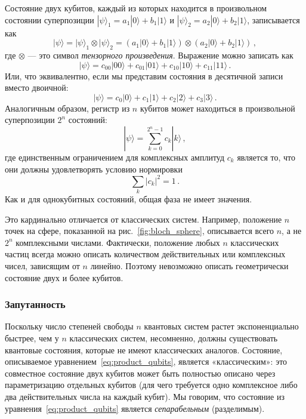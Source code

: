 \documentclass[a4paper,14pt]{extreport} %
\newcommand{\ket}[1]{|#1\rangle}
\begin{document}
Состояние двух кубитов, каждый из которых находится в произвольном состоянии суперпозиции
$\ket{\psi}_1 = a_1 \ket{0} + b_1 \ket{1}$ и $\ket{\psi}_2 = a_2
\ket{0} + b_2 \ket{1}$, записывается как
%
\begin{equation}
\ket{\psi} = \ket{\psi}_1 \otimes \ket{\psi}_2
= (a_1 \ket{0} + b_1 \ket{1}) \otimes (a_2 \ket{0} + b_2 \ket{1}) \,,
\label{eq:product_qubits}
\end{equation}
%
где $\otimes$ — это символ {\em тензорного произведения}.
Выражение можно записать как
\begin{equation}
\ket{\psi} = 
c_{00} \ket{00} + c_{01} \ket{01} + 
c_{10} \ket{10} + c_{11} \ket{11} \,.
\end{equation}
\noindent Или, что эквивалентно, если мы представим состояния в десятичной записи вместо двоичной:
\begin{equation}
\ket{\psi} = 
c_{0} \ket{0} + c_{1} \ket{1} + c_{2} \ket{2} + c_{3} \ket{3} \,.
\label{eq:psi_c_i}
\end{equation}
%
Аналогичным образом, регистр из $n$ кубитов может находиться в произвольной
суперпозиции $2^n$ состояний:
\begin{equation}
\ket{\psi} = \sum_{k=0}^{2^n-1} c_k \ket{k} \,,
\label{eq:general_superposition}
\end{equation}
где единственным ограничением для комплексных амплитуд $c_k$ является то,
что они должны удовлетворять условию нормировки
\begin{equation}
\sum_k |c_k|^2 = 1 \,.
\label{eq:normalization}
\end{equation}
Как и для однокубитных состояний, общая фаза не имеет
значения.

\noindent Это кардинально отличается от классических систем. Например, 
положение $n$ точек на сфере, показанной на рис.~\ref{fig:bloch_sphere}, 
описывается всего $n$, а не $2^n$ комплексными числами. Фактически, положение
любых $n$ классических частиц всегда можно описать количеством действительных или 
комплексных чисел, зависящим от $n$ линейно. Поэтому невозможно описать геометрически состояние двух и более кубитов.

\subsubsection{Запутанность}

Поскольку число степеней свободы $n$ квантовых систем растет экспоненциально быстрее,
чем у $n$ классических систем, несомненно, должны существовать квантовые состояния,
которые не имеют классических аналогов.
Состояние, описываемое уравнением~\ref{eq:product_qubits},
является «классическим»: это совместное состояние двух кубитов может быть полностью
описано через параметризацию отдельных кубитов (для чего требуется одно комплексное 
либо два действительных числа на каждый кубит). Мы говорим, что 
состояние из уравнения~\ref{eq:product_qubits} является {\em сепарабельным} (разделимым).
\end{document}
